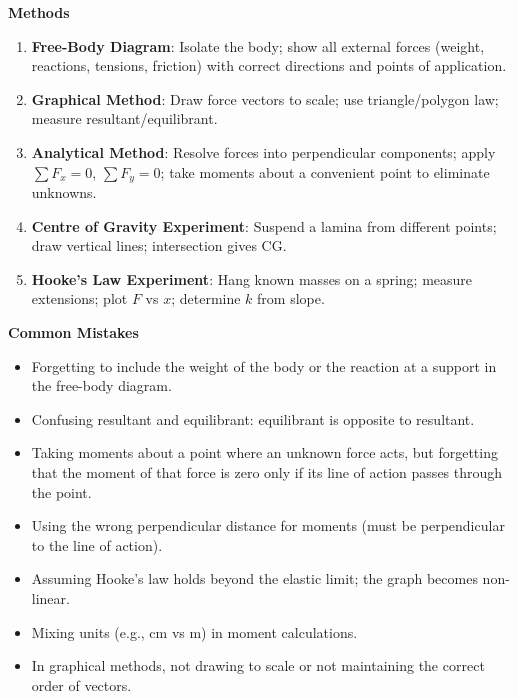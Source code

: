 \documentclass[11pt]{article}
\begin{document}
\begin{bilan}
\textbf{Methods}
\begin{enumerate}
\item \textbf{Free-Body Diagram}: Isolate the body; show all external forces (weight, reactions, tensions, friction) with correct directions and points of application.
\item \textbf{Graphical Method}: Draw force vectors to scale; use triangle/polygon law; measure resultant/equilibrant.
\item \textbf{Analytical Method}: Resolve forces into perpendicular components; apply $\sum F_x=0$, $\sum F_y=0$; take moments about a convenient point to eliminate unknowns.
\item \textbf{Centre of Gravity Experiment}: Suspend a lamina from different points; draw vertical lines; intersection gives CG.
\item \textbf{Hooke's Law Experiment}: Hang known masses on a spring; measure extensions; plot $F$ vs $x$; determine $k$ from slope.
\end{enumerate}

\textbf{Common Mistakes}
\begin{itemize}
\item Forgetting to include the weight of the body or the reaction at a support in the free-body diagram.
\item Confusing resultant and equilibrant: equilibrant is opposite to resultant.
\item Taking moments about a point where an unknown force acts, but forgetting that the moment of that force is zero only if its line of action passes through the point.
\item Using the wrong perpendicular distance for moments (must be perpendicular to the line of action).
\item Assuming Hooke's law holds beyond the elastic limit; the graph becomes non-linear.
\item Mixing units (e.g., cm vs m) in moment calculations.
\item In graphical methods, not drawing to scale or not maintaining the correct order of vectors.
\end{itemize}


\end{bilan}
\end{document}
